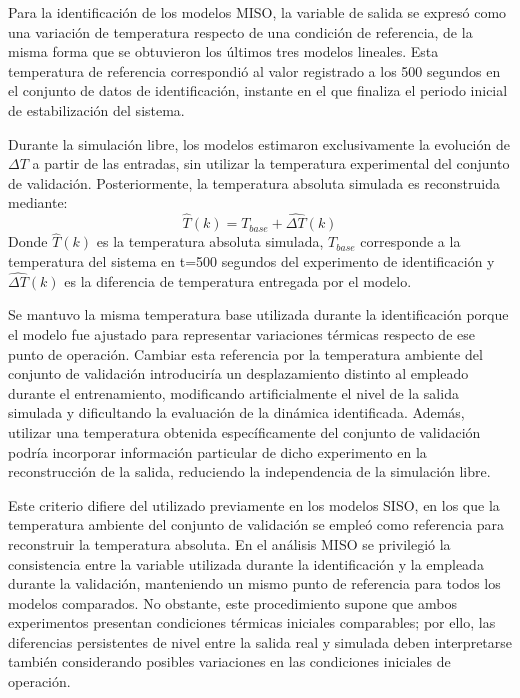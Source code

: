 \documentclass[11pt]{report}
\begin{document}
Para la identificación de los modelos MISO, la variable de salida se expresó como una variación de temperatura respecto de una condición de referencia, de la misma forma que se obtuvieron los últimos tres modelos lineales. Esta temperatura de referencia correspondió al valor registrado a los 500 segundos en el conjunto de datos de identificación, instante en el que finaliza el periodo inicial de estabilización del sistema.

Durante la simulación libre, los modelos estimaron exclusivamente la evolución de $\Delta T$ a partir de las entradas, sin utilizar la temperatura experimental del conjunto de validación. Posteriormente, la temperatura absoluta simulada es reconstruida mediante:
$$\hat{T}(k)=T_{base}+\hat{\Delta T}(k)$$
Donde $\hat{T}(k)$ es la temperatura absoluta simulada, $T_{base}$ corresponde a la temperatura del sistema en t=500 segundos del experimento de identificación y $\hat{\Delta T}(k)$ es la diferencia de temperatura entregada por el modelo.

Se mantuvo la misma temperatura base utilizada durante la identificación porque el modelo fue ajustado para representar variaciones térmicas respecto de ese punto de operación. Cambiar esta referencia por la temperatura ambiente del conjunto de validación introduciría un desplazamiento distinto al empleado durante el entrenamiento, modificando artificialmente el nivel de la salida simulada y dificultando la evaluación de la dinámica identificada. Además, utilizar una temperatura obtenida específicamente del conjunto de validación podría incorporar información particular de dicho experimento en la reconstrucción de la salida, reduciendo la independencia de la simulación libre.

Este criterio difiere del utilizado previamente en los modelos SISO, en los que la temperatura ambiente del conjunto de validación se empleó como referencia para reconstruir la temperatura absoluta. En el análisis MISO se privilegió la consistencia entre la variable utilizada durante la identificación y la empleada durante la validación, manteniendo un mismo punto de referencia para todos los modelos comparados. No obstante, este procedimiento supone que ambos experimentos presentan condiciones térmicas iniciales comparables; por ello, las diferencias persistentes de nivel entre la salida real y simulada deben interpretarse también considerando posibles variaciones en las condiciones iniciales de operación.
\end{document}
